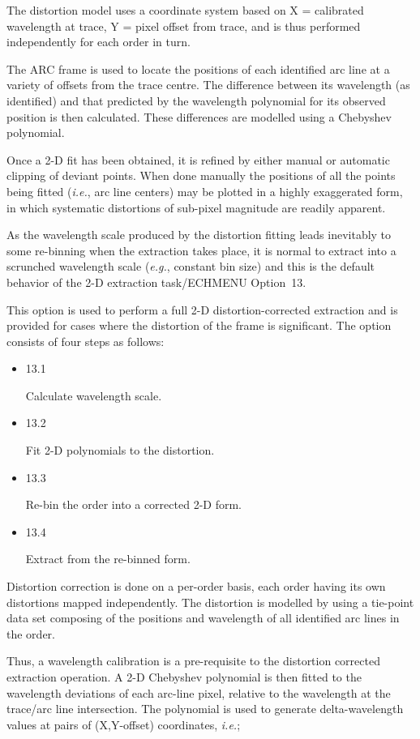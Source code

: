 \documentclass[11pt,twoside]{article}
\newcommand{\myindex}[1]{\index{#1}}
\renewcommand{\myindex}[1]{}
\begin{document}
The distortion model uses a coordinate system based on X =
calibrated wavelength at trace, Y = pixel offset from trace, and is
thus performed independently for each order in turn.

The ARC frame is used to locate the positions of each identified arc
line at a variety of offsets from the trace centre. The difference
between its wavelength (as identified) and that predicted by the
wavelength polynomial for its observed position is then calculated.
These differences are modelled using a Chebyshev polynomial.

Once a 2-D fit has been obtained,  it is refined by either manual or
automatic clipping of deviant points. When done manually the
positions of all the points being fitted ({\it{i.e.}}, arc line
centers) may be plotted in a highly exaggerated form, in which
systematic distortions of sub-pixel magnitude are readily apparent.

As the wavelength scale produced by the distortion fitting leads
inevitably to some re-binning when the extraction takes place, it is
normal to extract into a scrunched wavelength scale ({\it{e.g.}},
constant bin size) and this is the default behavior of the 2-D
extraction task/ECHMENU Option~13.

This option is used to perform a full 2-D distortion-corrected
extraction and is provided for cases where the distortion of the
frame is significant. The option consists of four steps as follows:

\begin{itemize}

\item {13.1}

      Calculate wavelength scale.

\item {13.2}

      Fit 2-D polynomials to the distortion.

\item {13.3}

      Re-bin the order into a corrected 2-D form.

\item {13.4}

      Extract from the re-binned form.

\end{itemize}

\myindex{Re-binning!2-D}
Distortion correction is done on a per-order basis, each order having its
own distortions mapped independently. The distortion is modelled by using a
tie-point data set composing of the positions and wavelength of all
identified arc lines in the order.
\myindex{Wavelength scales!2-D}
Thus, a wavelength calibration is a pre-requisite to the distortion
corrected extraction operation. A 2-D Chebyshev polynomial is then fitted to
the wavelength deviations of each arc-line pixel, relative to the
wavelength at the trace/arc line intersection. The polynomial is used to
generate delta-wavelength values at pairs of (X,Y-offset) coordinates,
{\it{i.e.}};
\end{document}
